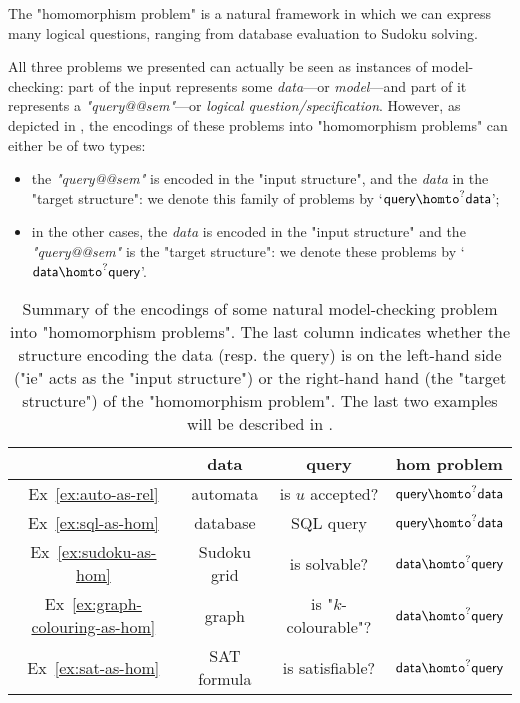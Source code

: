 \begin{known}
	The "homomorphism problem" is a natural framework in which we can express many
	logical questions, ranging from database evaluation to Sudoku solving.
\end{known}

All three problems we presented can actually be seen as instances of model-checking:
part of the input represents some \emph{data}---or \emph{model}---and part of it represents a
\emph{"query@@sem"}---or \emph{logical question/specification}.
However, as depicted in , 
the encodings of these problems into "homomorphism problems" can either be of two types:
\begin{itemize}
	\item the \emph{"query@@sem"} is encoded in the "input structure",
		and the \emph{data} in the "target structure": we denote
		this family of problems by `$\textsf{query} \homto^? \textsf{data}$';
	\item in the other cases, the \emph{data} is encoded in the "input structure"
		and the \emph{"query@@sem"} is the "target structure": we denote
		these problems by `$\textsf{data} \homto^? \textsf{query}$'.
\end{itemize}
\begin{table}[h]
	\centering
	\begin{tabular}{cccc}
		\toprule 
		& data & query & hom problem \\ \midrule 
		Ex~\ref{ex:auto-as-rel} & automata & is $u$ accepted? & $\textsf{query} \homto^? \textsf{data}$ \\
		Ex~\ref{ex:sql-as-hom} & database & SQL query & $\textsf{query} \homto^? \textsf{data}$ \\
		Ex~\ref{ex:sudoku-as-hom} & Sudoku grid & is solvable? & $\textsf{data} \homto^? \textsf{query}$ \\
		Ex~\ref{ex:graph-colouring-as-hom} & graph &
		is "$k$-colourable"? & $\textsf{data} \homto^? \textsf{query}$ \\
		Ex~\ref{ex:sat-as-hom} & SAT formula &
		is satisfiable? & $\textsf{data} \homto^? \textsf{query}$ \\ \bottomrule
	\end{tabular}
	\caption{\AP\label{tab:examples-encodings-in-hom}
		Summary of the encodings of some
		natural model-checking problem into "homomorphism problems".
		The last column indicates whether the structure encoding the data
		(resp. the query) is on the left-hand side ("ie" acts as the "input structure")
		or the right-hand hand (the "target structure")
		of the "homomorphism problem".
		The last two examples will be described in .
	}
\end{table}

